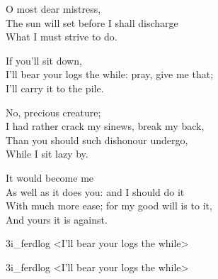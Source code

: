 \begin{verse_speech}[Ferdinand] 
O most dear mistress,\\
The sun will set before I shall discharge\\
What I must strive to do.
\end{verse_speech}

\begin{verse_speech}[Miranda] 
If you'll sit down,\\
I'll bear your logs the while: pray, give me that;\\
I'll carry it to the pile.
\end{verse_speech}

\begin{verse_speech}[Ferdinand] 
No, precious creature;\\
I had rather crack my sinews, break my back,\\
Than you should such dishonour undergo,\\
While I sit lazy by.
\end{verse_speech}

\begin{verse_speech}[Miranda] 
It would become me\\
As well as it does you: and I should do it\\
With much more ease; for my good will is to it,\\
And yours it is against.
\end{verse_speech}


\begin{pictures} %
	\begin{letter}
		\begin{colorbigpic}
			[1.1]
			{3i_ferdlog}
			{<I'll bear your logs the while>}
		\end{colorbigpic}
	\end{letter}
	\begin{a4}
		\begin{colorbigpic}
			[1]
			{3i_ferdlog}
			{<I'll bear your logs the while>}
		\end{colorbigpic}
	\end{a4}
\end{pictures}

